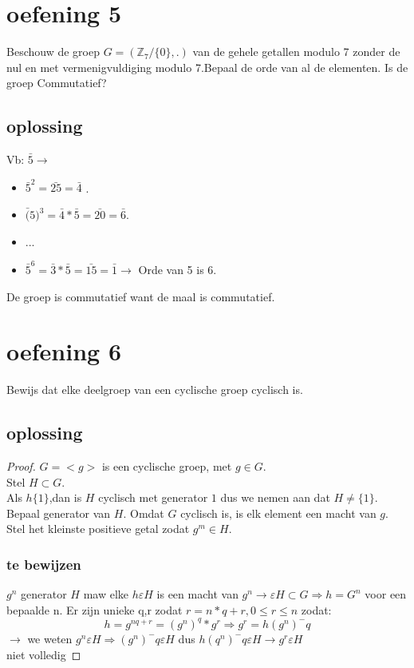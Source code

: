 \documentclass[12pt,a4paper]{article}
\begin{document}
\section*{oefening 5}

Beschouw de groep $G=( \mathbb{Z}_7 /\{0\},.)$ van de gehele getallen modulo 7 zonder de nul en met vermenigvuldiging modulo 7.Bepaal de orde van al de elementen. Is de groep Commutatief?
\subsection*{oplossing}
Vb: $\bar{5} \rightarrow$
\begin{itemize}
\item $\bar{5}^2=\bar{25}=\bar{4}$ .
\item $\bar(5)^3=\bar{4}*\bar{5}=\bar{20}=\bar{6}$.
\item ...
\item $\bar{5}^6=\bar{3}*\bar{5}=\bar{15}=\bar{1} \rightarrow$ Orde van 5 is 6.
\end{itemize}
De groep is commutatief want de maal is commutatief.
\pagebreak
\section*{oefening 6}

Bewijs dat elke deelgroep van een cyclische groep cyclisch is.
\subsection*{oplossing}
\begin{proof}
$G=<g>$ is een cyclische groep, met $g \in G$.
\\Stel $H \subset G$.
\\Als $h\{1\}$,dan is $H$ cyclisch met generator $1$ dus we nemen aan dat $H \neq \{1\}$.
\\Bepaal generator van $H$. Omdat $G$ cyclisch is, is elk element een macht van $g$. 
\\Stel het kleinste positieve getal zodat $g^m \in H$.
\subsubsection*{te bewijzen}
$g^n$ generator $H$ maw elke $h \varepsilon H$ is een macht van $g^n \rightarrow \varepsilon H \subset G \Rightarrow h=G^n$ voor een bepaalde n. Er zijn unieke q,r zodat $r=n*q+r,0\leqslant r \leqslant n$ zodat:
\[
h=g^{nq+r}=(g^n)^q*g^r \Rightarrow g^r=h(g^n)^-q
\]
$\rightarrow$ we weten $g^n \varepsilon H \Rightarrow (g^n)^-q \varepsilon H$ dus $h(q^n)^-q \varepsilon H \rightarrow g^r \varepsilon H$
\\niet volledig

\end{proof}
\end{document}

